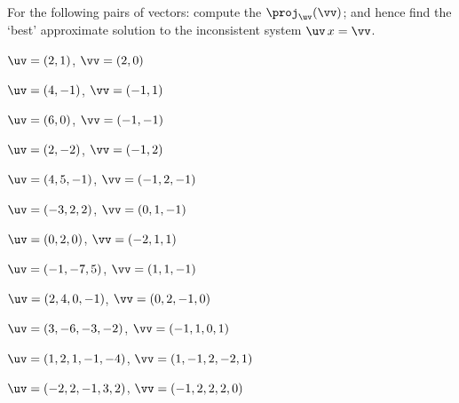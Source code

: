 \begin{exercise}  
For the following pairs of vectors: compute the  \(\proj_\uv(\vv)\); and hence find the `best' approximate solution to the inconsistent system \(\uv\,x=\vv\).

\begin{Parts}
\item \(\uv=(2,1)\), \(\vv=(2,0)\)

\item \(\uv=(4,-1)\), \(\vv=(-1,1)\)

\begin{OmitV1}
\item \(\uv=(6,0)\), \(\vv=(-1,-1)\)

\item \(\uv=(2,-2)\), \(\vv=(-1,2)\)
\end{OmitV1}

\item \(\uv=(4,5,-1)\), \(\vv=(-1,2,-1)\)

\item \(\uv=(-3,2,2)\), \(\vv=(0,1,-1)\)

\item \(\uv=(0,2,0)\), \(\vv=(-2,1,1)\)

\item \(\uv=(-1,-7,5)\), \(\vv=(1,1,-1)\)

\begin{OmitV1}
\item \(\uv=(2,4,0,-1)\), \(\vv=(0,2,-1,0)\)

\item \(\uv=(3,-6,-3,-2)\), \(\vv=(-1,1,0,1)\)

\item \(\uv=(1,2,1,-1,-4)\), \(\vv=(1,-1,2,-2,1)\)

\item \(\uv=(-2,2,-1,3,2)\), \(\vv=(-1,2,2,2,0)\)
\end{OmitV1}

\end{Parts}
\end{exercise}




